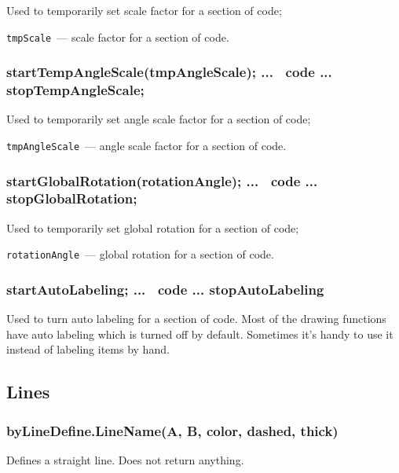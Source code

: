 	Used to temporarily set scale factor for a section of code;

	\texttt{tmpScale}~— scale factor for a section of code.
		
\subsubsection{startTempAngleScale(tmpAngleScale); ... \METAPOST\ code ... stopTempAngleScale;}\label{startTempAngleScale}

	Used to temporarily set angle scale factor for a section of code;

	\texttt{tmpAngleScale}~— angle scale factor for a section of code.

\subsubsection{startGlobalRotation(rotationAngle); ... \METAPOST\ code ... stopGlobalRotation;}\label{startGlobalRotation}

	Used to temporarily set global rotation for a section of code;

	\texttt{rotationAngle}~— global rotation for a section of code.
	
\subsubsection{startAutoLabeling; ... \METAPOST\ code ... stopAutoLabeling}\label{startAutoLabeling}

	Used to turn auto labeling for a section of code. Most of the drawing functions have auto labeling which is turned off by default. Sometimes it's handy to use it instead of labeling items by hand.



\subsection{Lines}


\subsubsection{byLineDefine.LineName(A, B, color, dashed, thick)}\label{byLineDefine}

	Defines a straight line. Does not return anything.
	

